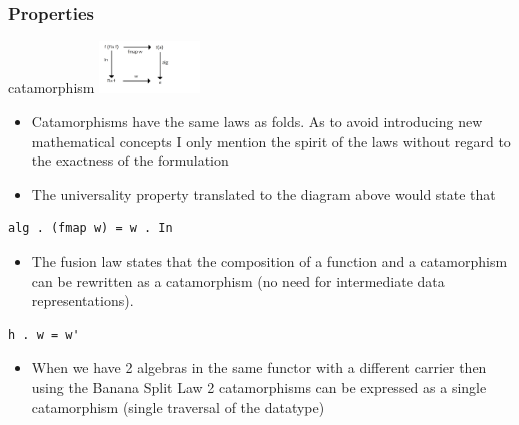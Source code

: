 \documentclass[10pt]{beamer}
\begin{document}
\begin{frame}[fragile]
\frametitle{Properties}

\begin{block}{catamorphism}
\includegraphics[width=0.2\textwidth]{graf3.png}	
\end{block}
\begin{itemize}
\item Catamorphisms have the same laws as folds. As to avoid introducing new mathematical concepts I only mention the 
	spirit of the laws without regard to the exactness of the formulation 
\item The universality property translated to the diagram above would state that

\end{itemize}

\begin{lstlisting}
alg . (fmap w) = w . In
\end{lstlisting}

\begin{itemize}
	\item The fusion law states that the composition of a function and a catamorphism can be rewritten as a catamorphism (no need for intermediate data representations).
\end{itemize}

\begin{lstlisting}
h . w = w'
\end{lstlisting}

\begin{itemize}
\item When we have 2 algebras in the same functor with a different carrier then using the Banana Split Law 2 catamorphisms can be expressed as a single catamorphism (single traversal of the datatype)
\end{itemize}
\end{frame}
\end{document}
